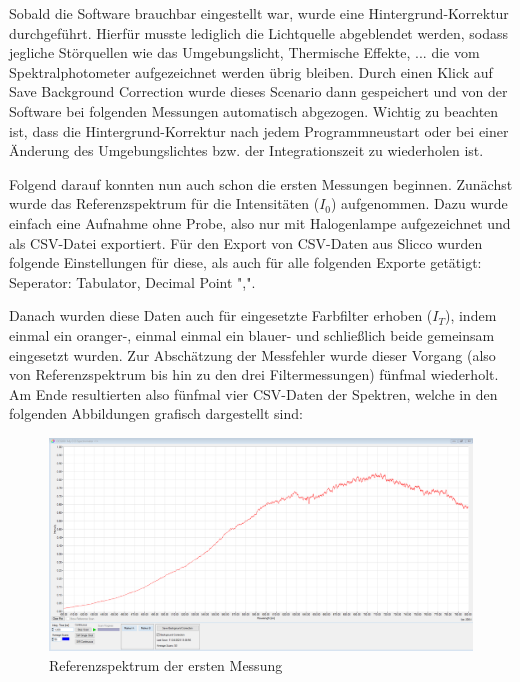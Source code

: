 \documentclass[12pt,a4paper,twoside]{article}
\begin{document}
\noindent
Sobald die Software brauchbar eingestellt war, wurde eine Hintergrund-Korrektur durchgeführt. Hierfür musste lediglich die Lichtquelle abgeblendet werden, sodass jegliche Störquellen wie das Umgebungslicht, Thermische Effekte, ... die vom Spektralphotometer aufgezeichnet werden übrig bleiben. Durch einen Klick auf Save Background Correction wurde dieses Scenario dann gespeichert und von der Software bei folgenden Messungen automatisch abgezogen.
Wichtig zu beachten ist, dass die Hintergrund-Korrektur nach jedem Programmneustart oder bei einer Änderung des Umgebungslichtes bzw. der Integrationszeit zu wiederholen ist. \newline

\noindent
Folgend darauf konnten nun auch schon die ersten Messungen beginnen. Zunächst wurde das Referenzspektrum für die Intensitäten ($I_{0}$) aufgenommen. Dazu wurde einfach eine Aufnahme ohne Probe, also nur mit Halogenlampe aufgezeichnet und als CSV-Datei exportiert.
Für den Export von CSV-Daten aus Slicco wurden folgende Einstellungen für diese, als auch für alle folgenden Exporte getätigt: Seperator: Tabulator, Decimal Point ",". \newline

\noindent
Danach wurden diese Daten auch für eingesetzte Farbfilter erhoben ($I_{T}$), indem einmal ein oranger-, einmal einmal ein blauer- und schließlich beide gemeinsam eingesetzt wurden. Zur Abschätzung der Messfehler wurde dieser Vorgang (also von Referenzspektrum bis hin zu den drei Filtermessungen) fünfmal wiederholt.
Am Ende resultierten also fünfmal vier CSV-Daten der Spektren, welche in den folgenden Abbildungen grafisch dargestellt sind:

\begin{figure}[H]
    \centering
    \includegraphics[width=0.4\linewidth]{nudes/Verlauf-Referenzspektrum.PNG}
    \caption{Referenzspektrum der ersten Messung}
    \label{fig:Referenzspektrum3.1Bild}
\end{figure}
\end{document}
